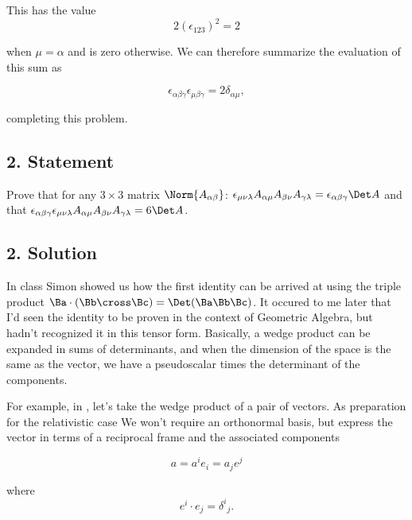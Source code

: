 This has the value
\begin{equation}\label{eqn:relElectroDynProblemSet3:250}
2 (\epsilon_{1 2 3})^2 = 2
\end{equation}

when $\mu = \alpha$ and is zero otherwise.  We can therefore summarize the evaluation of this sum as

\begin{equation}\label{eqn:relElectroDynProblemSet3:270}
\boxed{
\epsilon_{\alpha \beta \gamma}
\epsilon_{\mu \beta \gamma}
=  2\delta_{\alpha\mu},
}
\end{equation}

completing this problem.

\subsection{2. Statement}

Prove that for any $3 \times 3$ matrix $\Norm{A_{\alpha\beta}}$: $\epsilon_{\mu\nu\lambda} A_{\alpha \mu} A_{\beta\nu} A_{\gamma\lambda} = \epsilon_{\alpha \beta \gamma} \Det A$ and that $\epsilon_{\alpha\beta\gamma} \epsilon_{\mu\nu\lambda} A_{\alpha \mu} A_{\beta\nu} A_{\gamma\lambda} = 6 \Det A$.

\subsection{2. Solution}

In class Simon showed us how the first identity can be arrived at using the triple product $\Ba \cdot (\Bb \cross \Bc) = \Det(\Ba \Bb \Bc)$.  It occured to me later that I'd seen the identity to be proven in the context of Geometric Algebra, but hadn't recognized it in this tensor form.  Basically, a wedge product can be expanded in sums of determinants, and when the dimension of the space is the same as the vector, we have a pseudoscalar times the determinant of the components.

For example, in , let's take the wedge product of a pair of vectors.  As preparation for the relativistic  case We won't require an orthonormal basis, but express the vector in terms of a reciprocal frame and the associated components

\begin{equation}\label{eqn:relElectroDynProblemSet3:290}
a = a^i e_i = a_j e^j
\end{equation}

where
\begin{equation}\label{eqn:relElectroDynProblemSet3:310}
e^i \cdot e_j = {\delta^i}_j.
\end{equation}

